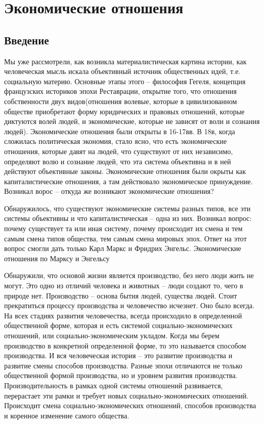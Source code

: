 
\section{Экономические отношения}
\subsection{Введение}

Мы уже рассмотрели, как возникла материалистическая картина истории, как человеческая мысль искала объективный источник общественных идей, т.е. социальную материю. Основные этапы этого – философия Гегеля, концепция французских историков эпохи Реставрации, открытие того, что отношения собственности двух видов(отношения волевые, которые в цивилизованном обществе приобретают форму юридических и правовых отношений, которые диктуются волей людей, и экономические, которые не зависят от воли и сознания людей). Экономические отношения были открыты в 16-17вв. В 18в, когда сложилась политическая экономия, стало ясно, что есть экономические отношения, которые давят на людей, что существуют от них независимо, определяют волю и сознание людей, что эта система объективна и в ней действуют объективные законы. Экономические отношения были окрыты как капиталистические отношения, а там действовало экономическое принуждение. Возникал ворос – откуда же возникают экономические отношения?

Обнаружилось, что существуют экономические системы разных типов, все эти системы объективны и что капиталистическая – одна из них. Возникал вопрос: почему существует та или иная систему, почему происходит их смена и тем самым смена типов общества, тем самым смена мировых эпох. Ответ на этот вопрос смогли дать только Карл Маркс и Фридрих Энгельс.
Экономические отношения по Марксу и Энгельсу

Обнаружили, что основой жизни является производство, без него люди жить не могут. Это одно из отличий человека и животных – люди создают то, чего в природе нет. Производство – основа бытия людей, существа людей. Стоит прекратиться процессу производства и человечество исчезнет. Оно было всегда. На всех стадиях развития человечества, всегда происходило в определенной общественной форме, которая и есть системой социально-экономических отношений, или социально-экономическим укладом. Когда мы берем производство в конкретной определенной форме, то это называется способом производства. И вся человеческая история – это развитие производства и развитие смены способов производства. Разные эпохи отличаются не только общественной формой производства, но и уровнем развития производства. Производительность в рамках одной системы отношений развивается, перерастает эти рамки и требует новых социально-экономических отношений. Происходит смена социально-экономических отношений, способов производства и коренное изменение самого общества.

